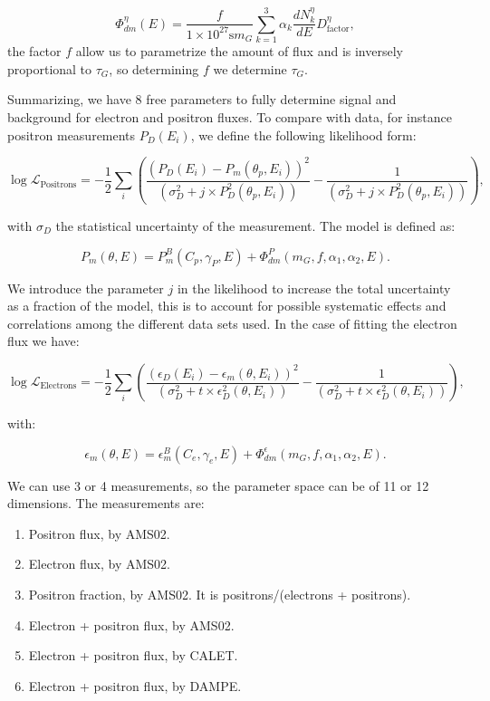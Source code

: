 \documentclass[a4paper,11pt]{article}
\newcommand{\subscript}[2]{$#1 _ #2$}
\begin{document}
 \begin{equation}
\Phi_{dm}^{\eta}(E) = \frac{f}{ 1\times 10^{27}\text{s} m_G} \sum_{k=1}^3{\alpha_k \frac{dN_k^{\eta}}{dE}} D^{\eta}_{\text{factor}},
 \end{equation}
the factor $f$ allow us to parametrize the amount of flux and is inversely proportional to $ \tau_G$, so determining $f$ we determine $ \tau_G$. 

Summarizing, we have 8 free parameters to fully determine signal and background for electron and positron fluxes. To compare with data, for instance positron measurements $P_D(E_i)$, we define the following likelihood form:

\begin{equation}
\log  \mathcal{L}_{\text{Positrons}} = -\frac{1}{2} \sum_i{\left( \frac{(P_D(E_i) - P_m(\theta_p,E_i ))^2}{(\sigma_D^2 + j\times P_D^2(\theta_p,E_i))} - \frac{1}{(\sigma_D^2 + j\times P_D^2(\theta_p,E_i))}  \right) },
\end{equation}

with $\sigma_D$ the statistical uncertainty of the measurement. The model is defined as:

\begin{equation}
P_m(\theta,E ) = P_m^B(C_p, \gamma_P, E) + \Phi_{dm}^{P}(m_G, f, \alpha_1, \alpha_2, E).
\end{equation}

We introduce the parameter $j$ in the likelihood to increase the total uncertainty as a fraction of the model, this is to account for possible systematic effects and correlations among the different data sets used. In the case of fitting the electron flux we have:

\begin{equation}
\log  \mathcal{L}_{\text{Electrons}} = -\frac{1}{2} \sum_i{\left( \frac{(\epsilon_D(E_i) - \epsilon_m(\theta,E_i ))^2}{(\sigma_D^2 + t\times \epsilon_D^2(\theta,E_i))} - \frac{1}{(\sigma_D^2 + t\times \epsilon_D^2(\theta,E_i))}  \right) },
\end{equation}

with:

\begin{equation}
\epsilon_m(\theta,E ) = \epsilon_m^B(C_e, \gamma_e, E) + \Phi_{dm}^{\epsilon}(m_G, f, \alpha_1, \alpha_2, E).
\end{equation}

We can use 3 or 4 measurements,  so the parameter space can be of 11 or 12 dimensions. The measurements are:
\begin{enumerate}[label=(\subscript{D}{{\arabic*}})]
\item Positron flux, by AMS02.
\item Electron flux, by AMS02.
\item Positron fraction, by AMS02. It is positrons/(electrons + positrons).
\item Electron + positron flux, by AMS02.
\item Electron + positron flux, by CALET.
\item Electron + positron flux, by DAMPE.
\end{enumerate}
\end{document}
